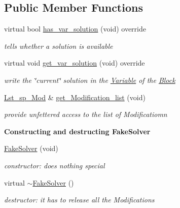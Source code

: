 \subsection*{Public Member Functions}
\begin{DoxyCompactItemize}
\item 
virtual bool \mbox{\hyperlink{class_s_m_spp__di__unipi__it_1_1_fake_solver_ade6d8078e2b6708ea0fa989629de2419}{has\+\_\+var\+\_\+solution}} (void) override
\begin{DoxyCompactList}\small\item\em tells whether a solution is available \end{DoxyCompactList}\item 
virtual void \mbox{\hyperlink{class_s_m_spp__di__unipi__it_1_1_fake_solver_ac83fa9679882440d13fb5940494699c5}{get\+\_\+var\+\_\+solution}} (void) override
\begin{DoxyCompactList}\small\item\em write the \char`\"{}current\char`\"{} solution in the \mbox{\hyperlink{class_s_m_spp__di__unipi__it_1_1_variable}{Variable}} of the \mbox{\hyperlink{class_s_m_spp__di__unipi__it_1_1_block}{Block}} \end{DoxyCompactList}\item 
\mbox{\hyperlink{group___modification___t_y_p_e_s_ga8a83b63d7963bc839660db495458f26d}{Lst\+\_\+sp\+\_\+\+Mod}} \& \mbox{\hyperlink{class_s_m_spp__di__unipi__it_1_1_fake_solver_ab664872065ad03ccd0ec9f0319a1e15a}{get\+\_\+\+Modification\+\_\+list}} (void)
\begin{DoxyCompactList}\small\item\em provide unfettered access to the list of Modificatiomn \end{DoxyCompactList}\end{DoxyCompactItemize}
\begin{Indent}\textbf{ Constructing and destructing Fake\+Solver}\par
\begin{DoxyCompactItemize}
\item 
\mbox{\label{class_s_m_spp__di__unipi__it_1_1_fake_solver_ac83ee852a58a8b7a765c8aff11832f5a}} 
\mbox{\hyperlink{class_s_m_spp__di__unipi__it_1_1_fake_solver_ac83ee852a58a8b7a765c8aff11832f5a}{Fake\+Solver}} (void)
\begin{DoxyCompactList}\small\item\em constructor\+: does nothing special \end{DoxyCompactList}\item 
\mbox{\label{class_s_m_spp__di__unipi__it_1_1_fake_solver_a138e940f5588239d8f9465166e46afd5}} 
virtual \mbox{\hyperlink{class_s_m_spp__di__unipi__it_1_1_fake_solver_a138e940f5588239d8f9465166e46afd5}{$\sim$\+Fake\+Solver}} ()
\begin{DoxyCompactList}\small\item\em destructor\+: it has to release all the Modifications \end{DoxyCompactList}\end{DoxyCompactItemize}
\end{Indent}
